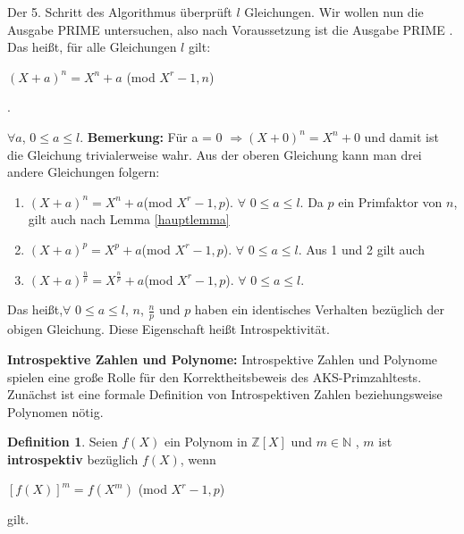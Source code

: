 \documentclass[12pt,oneside]{article}
\theoremstyle{remark}
\theoremstyle{definition}
\newtheorem{definition}{Definition}[section]
\begin{document}
Der 5. Schritt des Algorithmus überprüft $l$ Gleichungen. Wir wollen nun die Ausgabe PRIME untersuchen, also nach Voraussetzung ist die Ausgabe PRIME . Das heißt, für alle Gleichungen $l$ gilt:\newline\newline
\centerline{$(X + a)^n = X^n + a $ (mod $X^r - 1, n$)}.

$\forall a$, $ 0 \leq a \leq l$.\newline\newline
\textbf{Bemerkung:} Für a = 0 $\Rightarrow (X + 0)^n = X^n + 0$ und damit ist die Gleichung trivialerweise wahr.\newline\newline 
Aus der oberen Gleichung kann man drei andere Gleichungen folgern:
\begin{enumerate}
    \item $(X + a)^n = X^n + a $(mod $X^r - 1, p$).
$\forall$ $ 0 \leq a \leq l$.\newline\newline  
Da $p$ ein Primfaktor von $n$, gilt auch nach Lemma \ref{hauptlemma} \newline
\item $(X + a)^p = X^p + a $(mod $X^r - 1, p$).
$\forall$ $0 \leq a \leq l$.\newline\newline
Aus 1 und 2 gilt auch\newline
\item $(X + a)^{\frac{n}{p}} = X^{\frac{n}{p}} + a $(mod $X^r - 1, p$).
$\forall$ $0 \leq a \leq l$.\newline\newline
\end{enumerate}

Das heißt,$\forall$ $0 \leq a \leq l$, $n$, $\frac{n}{p}$ und $p$ haben ein identisches Verhalten bezüglich der obigen Gleichung. Diese Eigenschaft heißt Introspektivität.    


\textbf{Introspektive Zahlen und Polynome:}
Introspektive Zahlen und Polynome spielen eine große Rolle für den Korrektheitsbeweis des AKS-Primzahltests. Zunächst ist eine formale Definition von Introspektiven Zahlen beziehungsweise Polynomen nötig.

\begin{definition}
Seien $f(X)$ ein Polynom in $\mathbb{Z}[X]$ und $m \in \mathbb{N}$ , $m$ ist \textbf{introspektiv} bezüglich $f(X)$, wenn\newline\newline
    \centerline{$[f(X)]^{m} = f(X^m)$ (mod $X^r - 1,p$)} 
gilt. 
\end{definition}
\end{document}
